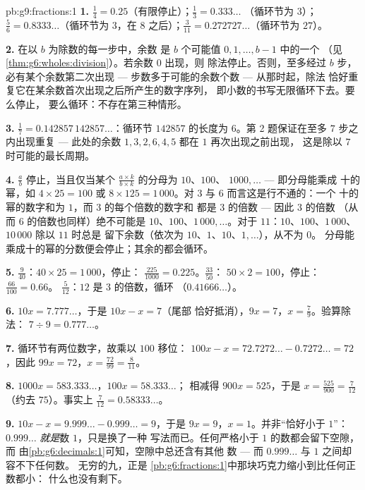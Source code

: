 \begin{solution}{pb:g9:fractions:1}
\textbf{1.} $\frac14 = 0.25$（有限停止）；$\frac13 = 0.333\ldots$
（循环节为 $3$）；$\frac56 = 0.8333\ldots$（循环节为 $3$，在
$8$ 之后）；$\frac{3}{11} = 0.272727\ldots$（循环节为 $27$）。

\textbf{2.} 在以 $b$ 为除数的每一步中，余数
是 $b$ 个可能值 $0, 1, \dots, b - 1$ 中的一个
（见\cref{thm:g6:wholes:division}）。若余数 $0$ 出现，则
除法停止。否则，至多经过 $b$ 步，
必有某个余数第二次出现 --- 步数多于可能的余数个数 ---
从那时起，除法
恰好重复它在某余数首次出现之后所产生的数字序列，
即小数的书写无限循环下去。要么停止，
要么循环：不存在第三种情形。

\textbf{3.} $\frac17 = 0.142857\,142857\ldots$：循环节
$142857$ 的长度为 $6$。第 2 题保证在至多
$7$ 步之内出现重复 --- 此处的余数
$1, 3, 2, 6, 4, 5$ 都在 $1$ 再次出现之前出现，
这是除以 $7$ 时可能的最长周期。

\textbf{4.} $\frac ab$ 停止，当且仅当某个
$\frac{a \times k}{b \times k}$ 的分母为 $10$、$100$、
$1000, \dots$ --- 即分母能乘成
十的幂，如 $4 \times 25 = 100$ 或
$8 \times 125 = 1\,000$。对 $3$ 与 $6$ 而言这是行不通的：一个
十的幂的数字和为 $1$，而 $3$ 的每个倍数的数字和
都是 $3$ 的倍数 --- 因此 $3$ 的倍数
（从而 $6$ 的倍数也同样）绝不可能是 $10$、$100$、$1\,000, \dots$。对于
$11$：$10$、$100$、$1\,000$、$10\,000$ 除以 $11$ 时总是
留下余数（依次为 $10$、$1$、$10$、$1, \dots$），从不为 $0$。
分母能乘成十的幂的分数便会停止；其余的都会循环。

\textbf{5.} $\frac{9}{40}$：$40 \times 25 = 1\,000$，停止：
$\frac{225}{1000} = 0.225$。$\frac{33}{50}$：
$50 \times 2 = 100$，停止：$\frac{66}{100} = 0.66$。
$\frac{5}{12}$：$12$ 是 $3$ 的倍数，循环
（$0.41666\ldots$）。

\textbf{6.} $10x = 7.777\ldots$，于是 $10x - x = 7$（尾部
恰好抵消），$9x = 7$，$x = \frac79$。验算除法：
$7 \div 9 = 0.777\ldots$。

\textbf{7.} 循环节有两位数字，故乘以 $100$ 移位：
$100x - x = 72.7272\ldots - 0.7272\ldots = 72$，因此
$99x = 72$，$x = \frac{72}{99} = \frac{8}{11}$。

\textbf{8.} $1000x = 583.333\ldots$，$100x = 58.333\ldots$；
相减得 $900x = 525$，于是
$x = \frac{525}{900} = \frac{7}{12}$（约去 $75$）。事实上
$\frac{7}{12} = 0.58333\ldots$。

\textbf{9.} $10x - x = 9.999\ldots - 0.999\ldots = 9$，于是
$9x = 9$，$x = 1$。并非“恰好小于 $1$”：
$0.999\ldots$ \emph{就是}数 $1$，只是换了一种
写法而已。任何严格小于 $1$ 的数都会留下空隙，而
由\cref{pb:g6:decimals:1}可知，空隙中总还含有其他
数 --- 而 $0.999\ldots$ 与 $1$ 之间却容不下任何数。
无穷的九，正是
\cref{pb:g6:fractions:1}中那块巧克力缩小到比任何正数都小：
什么也没有剩下。


\end{solution}
